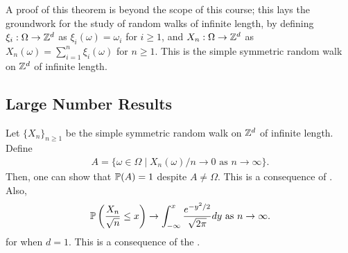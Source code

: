 A proof of this theorem is beyond the scope of this course; this lays the groundwork for the study of random walks of infinite length, by defining $\xi_{i}:\Omega \to \mathbb{Z}^{d}$ as $\xi_{i}(\omega) = \omega_{i}$ for $i \geq 1$, and $X_{n}:\Omega \to \mathbb{Z}^{d}$ as $X_{n}(\omega) = \sum_{i=1}^{n} \xi_{i}(\omega)$ for $n \geq 1$. This is the simple symmetric random walk on $\mathbb{Z}^{d}$ of infinite length.

\subsection{Large Number Results}
Let $\{X_{n}\}_{n \geq 1}$ be the simple symmetric random walk on $\mathbb{Z}^{d}$ of infinite length. Define
\begin{align}
    A = \{\omega \in \Omega \mid X_{n}(\omega)/n \to 0 \text{ as } n \to \infty\}.
\end{align}
Then, one can show that $\mathbb{P}(A) = 1$ despite $A \neq \Omega$. This is a consequence of . Also,
\begin{align}
    \mathbb{P}\left( \frac{X_{n}}{\sqrt{n}} \leq x \right) \to \int_{-\infty}^{x} \frac{e^{-y^{2}/2}}{\sqrt{2\pi}} dy \text{ as } n \to \infty.
\end{align}
for when $d = 1$. This is a consequence of the .